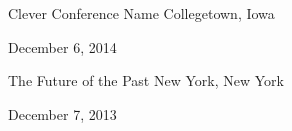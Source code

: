 

\vspace{1ex}

\begin{changemargin}{-0.3in}{0in}
\begin{etaremune}

\item
\headedsection %
{Clever Conference Name}
{Collegetown, Iowa} {

\headedsubsection %
{}
{December 6, 2014}
{\vspace{-\baselineskip}}
}

\item
\headedsection %
{The Future of the Past}
{New York, New York} {

\headedsubsection %
{}
{December 7, 2013}
{\vspace{-\baselineskip}}
}


\end{etaremune}
\end{changemargin}


\spacedhrule{0.5em}{-0.4em} %
